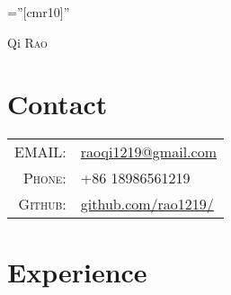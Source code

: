 \documentclass[a4paper,10pt]{article}
\begin{document}

\pagestyle{empty} %

\font\fb=''[cmr10]'' %

\par{\centering
		{\Huge Qi \textsc{Rao}
	}\bigskip\par}

\section{Contact}

\begin{tabular}{rl}
    \textsc{EMAIL:} & \href{mailto:raoqi1219@gmail.com}{raoqi1219@gmail.com}\\
    \textsc{Phone:}     & +86 18986561219\\
    \textsc{Github:}     & \href{https://github.com/rao1219/}{github.com/rao1219/} \\
\end{tabular}

\section{Experience}
\end{document}
